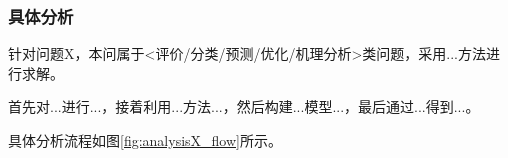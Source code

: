 
\subsubsection{具体分析}

针对问题X，本问属于<评价/分类/预测/优化/机理分析>类问题，采用...方法进行求解。

首先对...进行...，接着利用...方法...，然后构建...模型...，最后通过...得到...。

具体分析流程如图\ref{fig:analysisX_flow}所示。

